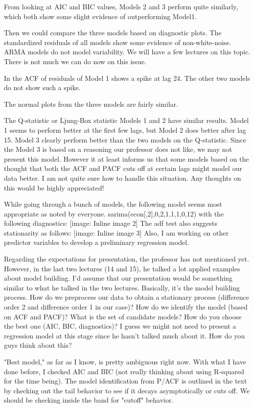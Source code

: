 \documentclass[twoside,twocolumn]{article}
\begin{document}
From looking at AIC and BIC values, Models 2 and 3 perform quite similarly, which both show some slight evidence of outperforming Model1.

Then we could compare the three models based on diagnostic plots. The standardized residuals of all models show some evidence of non-white-noise. ARMA models do not model variability. We will have a few lectures on this topic. There is not much we can do now on this issue.

In the ACF of residuals of Model 1 shows a spike at lag 24. The other two models do not show such a spike.

The normal plots from the three models are fairly similar.

The Q-statistic or Ljung-Box statistic
Models 1 and 2 have similar results. Model 1 seems to perform better at the first few lags, but Model 2 does better after lag 15. Model 3 clearly perform better than the two models on the Q-statistic. Since the Model 3 is based on a reasoning our professor does not like, we may not present this model. However it at least informs us that some models based on the thought that both the ACF and PACF cuts off at certain lags might model our data better. I am not quite sure how to handle this situation. Any thoughts on this would be highly appreciated!

While going through a bunch of models, the following model seems most appropriate as noted by everyone. sarima(econ[,2],0,2,1,1,1,0,12) with the following diagnostics: [image: Inline image 2] The adf test also suggests stationarity as follows: [image: Inline image 3] Also, I am working on other predictor variables to develop a preliminary regression model.

Regarding the expectations for presentation, the professor has not
mentioned yet. However, in the last two lectures (14 and 15), he talked a
lot applied examples about model building. I'd assume that our presentation
would be something similar to what he talked in the two lectures.
Basically, it's the model building process. How do we preprocess our data
to obtain a stationary process (difference order 2 and difference order 1
in our case)? How do we identify the model (based on ACF and PACF)? What is
the set of candidate models? How do you choose the best one (AIC, BIC,
diagnostics)? I guess we might not need to present a regression model at
this stage since he hasn't talked much about it. How do you guys think
about this?



"Best model," as far as I know, is pretty ambiguous right now. With what I have done before, I checked AIC and BIC (not really thinking about using R-squared for the time being). The model identification from P/ACF is outlined in the text by checking out the tail behavior to see if it decays asymptotically or cuts off. We should be checking inside the band for "cutoff" behavior.
\end{document}
